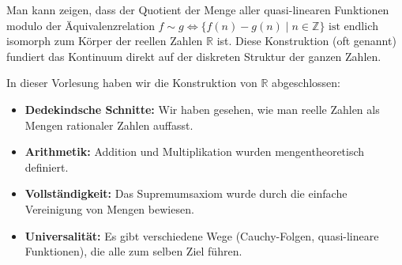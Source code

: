 \begin{math-stroke}

\begin{explanation-of-steps}
Man kann zeigen, dass der Quotient der Menge aller quasi-linearen Funktionen modulo der Äquivalenzrelation $f \sim g \iff \{f(n) - g(n) \mid n \in \mathbb{Z}\} \text{ ist endlich}$ isomorph zum Körper der reellen Zahlen $\mathbb{R}$ ist. Diese Konstruktion (oft  genannt) fundiert das Kontinuum direkt auf der diskreten Struktur der ganzen Zahlen.
\end{explanation-of-steps}
\end{math-stroke}

\begin{nice-box}
In dieser Vorlesung haben wir die Konstruktion von $\mathbb{R}$ abgeschlossen:
\begin{itemize}
    \item \textbf{Dedekindsche Schnitte:} Wir haben gesehen, wie man reelle Zahlen als Mengen rationaler Zahlen auffasst.
    \item \textbf{Arithmetik:} Addition und Multiplikation wurden mengentheoretisch definiert.
    \item \textbf{Vollständigkeit:} Das Supremumsaxiom wurde durch die einfache Vereinigung von Mengen bewiesen.
    \item \textbf{Universalität:} Es gibt verschiedene Wege (Cauchy-Folgen, quasi-lineare Funktionen), die alle zum selben Ziel führen.
\end{itemize}
\end{nice-box}


